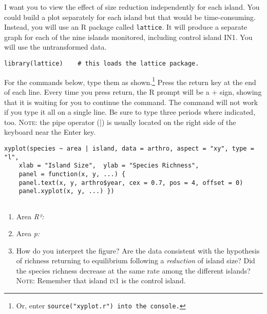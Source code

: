 \documentclass[11pt]{article}
\begin{document}
I want you to view the effect of size reduction independently for each island.  You could build a plot separately for each island but that would be time-consuming.  Instead, you will use an R package called \texttt{lattice}.  It will produce a separate graph for each of the nine islands monitored, including control island IN1. You will use the untransformed data.


\begin{verbatim}
library(lattice)	# this loads the lattice package.

\end{verbatim}


For the commands below, type them as shown.\footnote{Or, enter \texttt{source("xyplot.r") into the console.}} Press the return key at the end of each line. Every time you press return, the R prompt will be a $+$ sign, showing that it is waiting for you to continue the command.  The command will not work if you type it all on a single line. Be sure to type three periods where indicated, too. \textsc{Note:} the pipe operator (|) is usually located on the right side of the keyboard near the Enter key.

\begin{verbatim}
xyplot(species ~ area | island, data = arthro, aspect = "xy", type = "l", 
    xlab = "Island Size",  ylab = "Species Richness", 
    panel = function(x, y, ...) {
    panel.text(x, y, arthro$year, cex = 0.7, pos = 4, offset = 0)
    panel.xyplot(x, y, ...) })
    
\end{verbatim}

\begin{enumerate}[resume]
	\item  Area \textit{R²:} 
	
	\item Area \textit{p:}
	
	\item How do you interpret the figure? Are the data consistent with the hypothesis of richness returning to equilibrium following a \textit{reduction} of island size? Did the species richness decrease at the same rate among the different islands? \textsc{Note:} Remember that island \textsc{in1} is the control island.
	
\end{enumerate}
\end{document}
